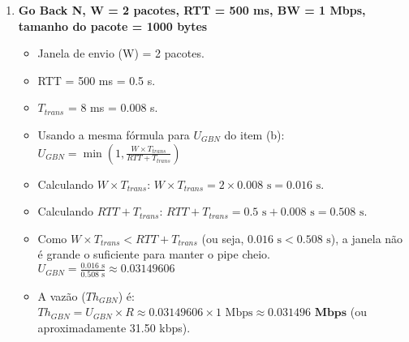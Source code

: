 \begin{enumerate}[label=\alph*.]
    \vspace{0.3cm}

    \item \textbf{Go Back N, W = 2 pacotes, RTT = 500 ms, BW = 1 Mbps, tamanho do pacote = 1000 bytes}
    \begin{itemize}
        \item Janela de envio (W) = 2 pacotes.
        \item RTT = 500 ms = 0.5 s.
        \item $T_{trans}$ = 8 ms = 0.008 s.
        \item Usando a mesma fórmula para $U_{GBN}$ do item (b):
        $U_{GBN} = \min\left(1, \frac{W \times T_{trans}}{RTT + T_{trans}}\right)$
        \item Calculando $W \times T_{trans}$:
        $W \times T_{trans} = 2 \times 0.008 \text{ s} = 0.016 \text{ s}$.
        \item Calculando $RTT + T_{trans}$:
        $RTT + T_{trans} = 0.5 \text{ s} + 0.008 \text{ s} = 0.508 \text{ s}$.
        \item Como $W \times T_{trans} < RTT + T_{trans}$ (ou seja, $0.016 \text{ s} < 0.508 \text{ s}$), a janela não é grande o suficiente para manter o pipe cheio.
        $U_{GBN} = \frac{0.016 \text{ s}}{0.508 \text{ s}} \approx 0.03149606$
        \item A vazão ($Th_{GBN}$) é:
        $Th_{GBN} = U_{GBN} \times R \approx 0.03149606 \times 1 \text{ Mbps} \approx \mathbf{0.031496 \text{ Mbps}}$ (ou aproximadamente 31.50 kbps).
    \end{itemize}

    \vspace{0.3cm}


\end{enumerate}

